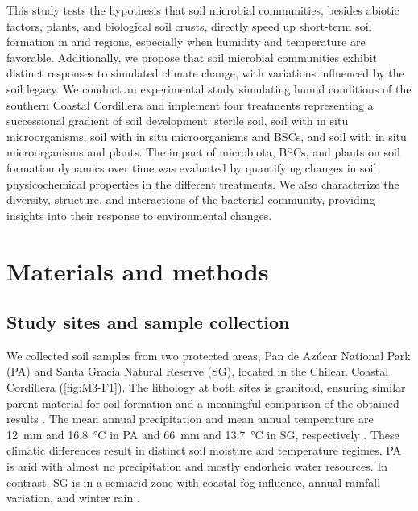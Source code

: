 This study tests the hypothesis that soil microbial communities, besides abiotic factors, plants, and biological soil crusts, directly speed up short-term soil formation in arid regions, especially when humidity and temperature are favorable. Additionally, we propose that soil microbial communities exhibit distinct responses to simulated climate change, with variations influenced by the soil legacy. We conduct an experimental study simulating humid conditions of the southern Coastal Cordillera and implement four treatments representing a successional gradient of soil development: sterile soil, soil with in situ microorganisms, soil with in situ microorganisms and BSCs, and soil with in situ microorganisms and plants. The impact of microbiota, BSCs, and plants on soil formation dynamics over time was evaluated by quantifying changes in soil physicochemical properties in the different treatments. We also characterize the diversity, structure, and interactions of the bacterial community, providing insights into their response to environmental changes.

\section{Materials and methods}
\subsection{Study sites and sample collection}

We collected soil samples from two protected areas, Pan de Az{\'u}car National Park (PA) and Santa Gracia Natural Reserve (SG), located in the Chilean Coastal Cordillera (\ref{fig:M3-F1}). 
The lithology at both sites is granitoid, ensuring similar parent material for soil formation and a meaningful comparison of the obtained results \citep{Bernhard2018, Oeser2018}. 
The mean annual precipitation and mean annual temperature are \SI{12}{\milli\metre} and \SI{16.8}{\degreeCelsius} in PA and \SI{66}{\milli\metre} and \SI{13.7}{\degreeCelsius} in SG, respectively \citep{Munoz2007}. 
These climatic differences result in distinct soil moisture and temperature regimes. 
PA is arid with almost no precipitation and mostly endorheic water resources. 
In contrast, SG is in a semiarid zone with coastal fog influence, annual rainfall variation, and winter rain \citep{Bernhard2018}.


